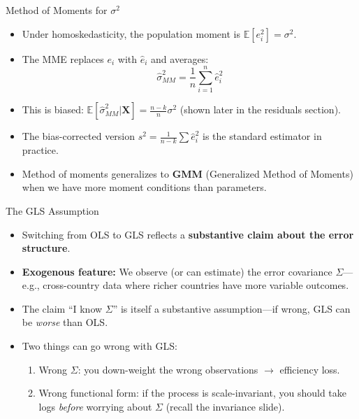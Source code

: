 \documentclass[aspectratio=169, handout]{beamer}
\numberwithin{equation}{section}
\begin{document}
\begin{frame}{Method of Moments for $\sigma^2$}
\begin{itemize}
\item Under homoskedasticity, the population moment is $\mathbb{E}[e_i^2]=\sigma^2$.\pause
\item The MME replaces $e_i$ with $\hat{e}_i$ and averages:
$$\hat{\sigma}^2_{MM}=\frac{1}{n}\sum_{i=1}^n\hat{e}_i^2$$\pause
\item This is biased: $\mathbb{E}[\hat{\sigma}^2_{MM}|\bm{X}]=\frac{n-k}{n}\sigma^2$ (shown later in the residuals section).\pause
\item The bias-corrected version $s^2=\frac{1}{n-k}\sum \hat{e}_i^2$ is the standard estimator in practice.
\item Method of moments generalizes to \textbf{GMM} (Generalized Method of Moments) when we have more moment conditions than parameters.
\end{itemize}
\end{frame}


\begin{frame}{The GLS Assumption}
\begin{itemize}
\item Switching from OLS to GLS reflects a \textbf{substantive claim about the error structure}.\pause

\item \textbf{Exogenous feature:} We observe (or can estimate) the error covariance $\Sigma$---e.g., cross-country data where richer countries have more variable outcomes.\pause

\item The claim ``I know $\Sigma$'' is itself a substantive assumption---if wrong, GLS can be \emph{worse} than OLS.\pause

\item Two things can go wrong with GLS:
\begin{enumerate}
\item Wrong $\Sigma$: you down-weight the wrong observations $\to$ efficiency loss.
\item Wrong functional form: if the process is scale-invariant, you should take logs \emph{before} worrying about $\Sigma$ (recall the invariance slide).
\end{enumerate}
\end{itemize}
\end{frame}
\end{document}
